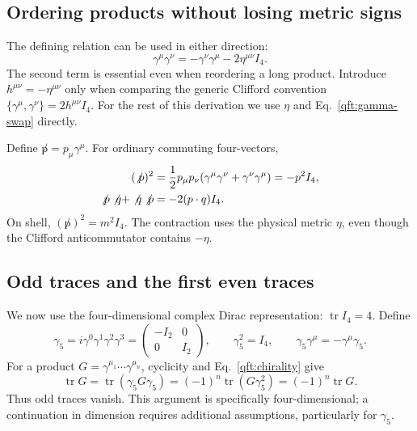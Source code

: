 \subsection{Ordering products without losing metric signs}
The defining relation can be used in either direction:
\begin{equation}\label{qft:gamma-swap}
 \gamma^\mu\gamma^\nu=-\gamma^\nu\gamma^\mu
 -2\eta^{\mu\nu}I_4.
\end{equation}
The second term is essential even when reordering a long product.
Introduce $h^{\mu\nu}=-\eta^{\mu\nu}$ only when comparing the generic
Clifford convention $\{\gamma^\mu,\gamma^\nu\}=2h^{\mu\nu}I_4$.
For the rest of this derivation we use $\eta$ and
Eq.~\eqref{qft:gamma-swap} directly.

Define $\not p=p_\mu\gamma^\mu$. For ordinary commuting four-vectors,
\begin{align}
 (\not p)^2
 &=\frac12p_\mu p_\nu
  (\gamma^\mu\gamma^\nu+\gamma^\nu\gamma^\mu)
 =-p^2I_4,\notag\\
 \not p\not q+\not q\not p&=-2(p\cdot q)I_4.
 \label{qft:slash-product}
\end{align}
On shell, $(\not p)^2=m^2I_4$. The contraction uses the physical
metric $\eta$, even though the Clifford anticommutator contains $-\eta$.

\subsection{Odd traces and the first even traces}
We now use the four-dimensional complex Dirac representation:
$\operatorname{tr}I_4=4$. Define
\begin{equation}\label{qft:chirality}
 \gamma_5=i\gamma^0\gamma^1\gamma^2\gamma^3
 =\begin{pmatrix}-I_2&0\\0&I_2\end{pmatrix},\qquad
 \gamma_5^2=I_4,\qquad
 \gamma_5\gamma^\mu=-\gamma^\mu\gamma_5.
\end{equation}
For a product $G=\gamma^{\mu_1}\cdots\gamma^{\mu_n}$, cyclicity and
Eq.~\eqref{qft:chirality} give
\begin{equation}\label{qft:odd-trace}
 \operatorname{tr}G
 =\operatorname{tr}(\gamma_5G\gamma_5)
 =(-1)^n\operatorname{tr}(G\gamma_5^2)
 =(-1)^n\operatorname{tr}G.
\end{equation}
Thus odd traces vanish. This argument is specifically four-dimensional;
a continuation in dimension requires additional assumptions, particularly
for $\gamma_5$.

